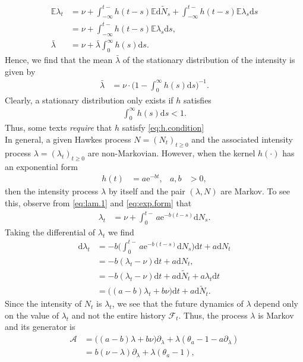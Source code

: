 \documentclass[12pt]{book}
\numberwithin{equation}{chapter}
\theoremstyle{plain}
\numberwithin{theorem}{section}
\theoremstyle{definition}
\numberwithin{exercise}{chapter}
\newcommand{\<}{\langle}
\renewcommand{\>}{\rangle}
\renewcommand{\(}{\left(}
\renewcommand{\)}{\right)}
\renewcommand{\[}{\left[}
\renewcommand{\]}{\right]}
\newcommand\Eb{\mathds{E}}
\newcommand\Ac{\mathscr{A}}
\newcommand\Fc{\mathscr{F}}
\newcommand\lam{\lambda}
\newcommand\Nt{\widetilde{N}}
\renewcommand\d{\partial}
\newcommand\dd{\mathrm{d}}
\newcommand\ee{\mathrm{e}}
\begin{document}
\begin{align}
\Eb \lambda_t
	&=	\nu + \int_{-\infty}^{t-}h(t-s) \Eb \dd \Nt_s + \int_{-\infty}^{t-}h(t-s) \Eb \lam_s \dd s \\
	&=	\nu + \int_{-\infty}^{t-}h(t-s) \Eb \lam_s \dd s , \\
\bar{\lam}
	&=	\nu + \bar{\lam} \int_0^\infty h(s) \dd s .
\end{align}
Hence, we find that the mean $\bar{\lam}$ of the stationary distribution of the intensity is given by
\begin{align}
\bar{\lam}
	&=	\nu \cdot \Big( 1 - \int_0^\infty h(s) \dd s \Big)^{-1} .
\end{align}
Clearly, a stationary distribution only exists if $h$ satisfies
\begin{align}
\int_0^\infty h(s) \dd s
	< 1 . \label{eq:h.condition}
\end{align}
Thus, some texts \emph{require} that $h$ satisfy \eqref{eq:h.condition}
\\[0.5em]
In general, a given Hawkes process $N = (N_t)_{t \geq 0}$ and the associated intensity process $\lam = (\lam_t)_{t \geq 0}$ are non-Markovian.  However, when the kernel $h(\cdot)$ has an exponential form
\begin{align}
h(t)
	&=	a \ee^{-bt}, &
a,b
	&>	0, \label{eq:exp.form}
\end{align}
then the intensity process $\lam$ by itself and the pair $(\lam,N)$ are Markov.  To see this, observe from \eqref{eq:lam.1} and \eqref{eq:exp.form} that
\begin{align}
\lam_t
	&=	\nu + \int_0^{t-} a \ee^{-b(t-s)} \dd N_s .
\end{align}
Taking the differential of $\lam_t$ we find
\begin{align}
\dd \lam_t
	&=	- b \Big( \int_0^{t-} a \ee^{-b(t-s)} \dd N_s \Big) \dd t + a \dd N_t \\
	&=	- b ( \lam_t - \nu ) \dd t + a \dd N_t , \\
	&=	- b ( \lam_t - \nu ) \dd t + a \dd \Nt_t + a \lam_t \dd t \\
	&=	\Big( (a - b) \lam_t + b \nu \Big) \dd t + a \dd \Nt_t .
\end{align}
Since the intensity of $N_t$ is $\lam_t$, we see that the future dynamics of $\lam$ depend only on the value of $\lam_t$ and not the entire history $\Fc_t$.  Thus, the process $\lam$ is Markov and its generator is
\begin{align}
\Ac
	&=	\Big( (a -b) \lam + b \nu \Big) \d_\lam  + \lam \( \theta_a - 1 - a \d_\lam  \) \\
	&=	 b ( \nu - \lam ) \d_\lam + \lam \( \theta_a - 1 \) ,
\end{align}
\end{document}
